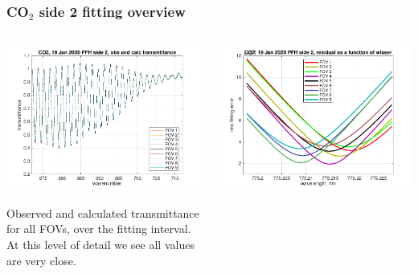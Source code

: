 \documentclass[10pt]{beamer}
\begin{document}
\begin{frame}
\frametitle{CO$_2$ side 2 fitting overview}
\begin{columns}[t]
\begin{column}{0.5\textwidth}  
  \begin{centering}
  \includegraphics[width=\textwidth]{01-19_pfh_s2_CO2/CO2_obs_and_calc.png}
  \end{centering}\vspace{3mm}

Observed and calculated transmittance for all FOVs, over the fitting
interval.  At this level of detail we see all values are very close.

\end{column}

\begin{column}{0.5\textwidth}
  \begin{centering}
  \includegraphics[width=\textwidth]{01-19_pfh_s2_CO2/CO2_wlaser_fit.png}
  \end{centering}\vspace{3mm}


\end{column}
\end{columns}
\end{frame}
\end{document}
